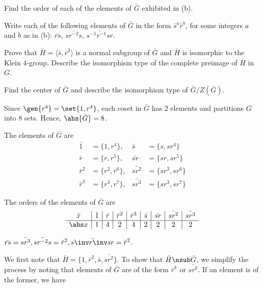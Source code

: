 \begin{problems}
\begin{problems}
        \item Find the order of each of the elements of $\bar{G}$ exhibited in (b).
        \item Write each of the following elements of $\bar{G}$ in the form $\bar{s}^a \bar{r}^b$, for some integers $a$ and $b$ as in (b): $\bar{rs}$, $\bar{sr^{-2}s}$, $\bar{s^{-1}r^{-1}sr}$.
        \item Prove that $\bar{H} = \langle \bar{s}, \bar{r}^2 \rangle$ is a normal subgroup of $\bar{G}$ and $\bar{H}$ is isomorphic to the Klein $4$-group. Describe the isomorphism type of the complete preimage of $\bar{H}$ in $G$.
        \item Find the center of $\bar G$ and describe the isomorphism type of $\bar G/Z(\bar G)$.
    \end{problems}
    \begin{solalph}
        \item Since $\gen{r^4} = \set{1, r^4}$, each coset in $\bar G$ has 2 elements and partitions $G$ into 8 sets. Hence, $\abs{\bar G} = 8$.
        \item The elements of $\bar G$ are
        \begin{align*}
            \bar 1 & = \{1, r^4\}, & \bar{s} & = \{s, sr^4\} \\
            \bar r & = \{r, r^5\}, & \bar{sr} & = \{sr, sr^5\} \\
            \bar r^2 & = \{r^2, r^6\}, & \bar{sr^2} & = \{sr^2, sr^6\} \\
            \bar r^3 & = \{r^3, r^7\}, & \bar{sr^3} & = \{sr^3, sr^7\}
        \end{align*}
        \item The orders of the elements of $\bar G$ are
        \[
        \begin{array}{c|c|c|c|c|c|c|c|c}
            \bar x & \bar 1 & \bar r & \bar r^2 & \bar r^3 & \bar s & \bar{sr} & \bar{sr^2} & \bar{sr^3} \\
            \hline
            \abs x & 1 & 4 & 2 & 4 & 2 & 2 & 2 & 2
        \end{array}
        \]
        \item $\bar{rs} = \bar{sr^3}, \bar{sr^{-2}s} = \bar r^2, \bar{s\inv r\inv sr} = \bar r^2$.
        \item We first note that $\bar H = \{1, \bar r^2, \bar s, \bar{sr^2}\}$. To show that $\bar H \nsub \bar G$, we simplify the process by noting that elements of $\bar G$ are of the form $\bar r^k$ or $\bar{sr^k}$. If an element is of the former, we have
        \begin{align*}

\end{align*}
\end{solalph}
\end{problems}
